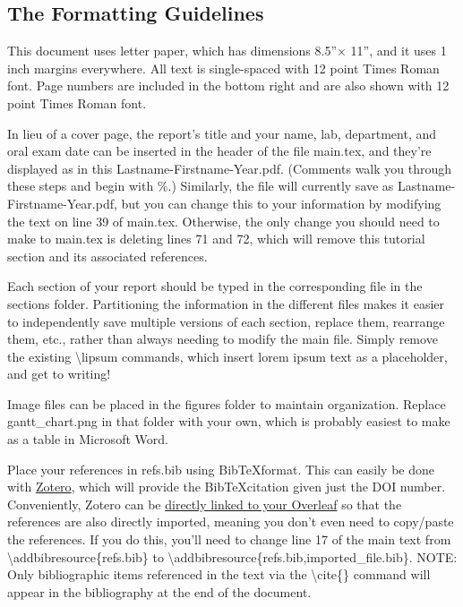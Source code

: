 \subsection{The Formatting Guidelines}
\label{subsec:format}

This document uses letter paper, which has dimensions 8.5''$\times$ 11'', and it uses 1 inch margins everywhere. All text is single-spaced with 12 point Times Roman font. Page numbers are included in the bottom right and are also shown with 12 point Times Roman font. 

In lieu of a cover page, the report's title and your name, lab, department, and oral exam date can be inserted in the header of the file main.tex, and they're displayed as in this Lastname-Firstname-Year.pdf. (Comments walk you through these steps and begin with \%.) Similarly, the file will currently save as Lastname-Firstname-Year.pdf, but you can change this to your information by modifying the text on line 39 of main.tex. Otherwise, the only change you should need to make to main.tex is deleting lines 71 and 72, which will remove this tutorial section and its associated references. 

Each section of your report should be typed in the corresponding file in the sections folder. Partitioning the information in the different files makes it easier to independently save multiple versions of each section, replace them, rearrange them, etc., rather than always needing to modify the main file. Simply remove the existing \textbackslash lipsum commands, which insert lorem ipsum text as a placeholder, and get to writing! 

Image files can be placed in the figures folder to maintain organization. Replace gantt\_chart.png in that folder with your own, which is probably easiest to make as a table in Microsoft Word. 

Place your references in refs.bib using Bib\TeX format. This can easily be done with \href{https://www.zotero.org/}{Zotero}, which will provide the Bib\TeX citation given just the DOI number. Conveniently, Zotero can be \href{https://www.overleaf.com/learn/how-to/How_to_link_your_Overleaf_account_to_Mendeley_and_Zotero}{directly linked to your Overleaf} so that the references are also directly imported, meaning you don't even need to copy/paste the references. If you do this, you'll need to change line 17 of the main text from \textbackslash addbibresource\{refs.bib\} to \textbackslash addbibresource\{refs.bib,imported\_file.bib\}. NOTE: Only bibliographic items referenced in the text via the \textbackslash cite\{\} command will appear in the bibliography at the end of the document. 


